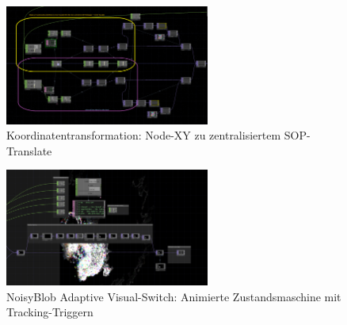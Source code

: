 
\begin{figure}[!htbp]
    \centering
    \includegraphics[width=0.6\textwidth,height=0.25\textheight,keepaspectratio]{images/docupictures/NodeXYzuSOPZentriertemTranslate.png}
    \caption{Koordinatentransformation: Node-XY zu zentralisiertem SOP-Translate}
    \label{fig:coordinate_transformation}
\end{figure}

\begin{figure}[!htbp]
    \centering
    \includegraphics[width=0.6\textwidth,height=0.25\textheight,keepaspectratio]{images/docupictures/NoisyBlob_animatedSwitchzwischenBlitzUndNichtBlitzBeiTrackingTrigger.png}
    \caption{NoisyBlob Adaptive Visual-Switch: Animierte Zustandsmaschine mit Tracking-Triggern}
    \label{fig:animated_switch}
\end{figure}

